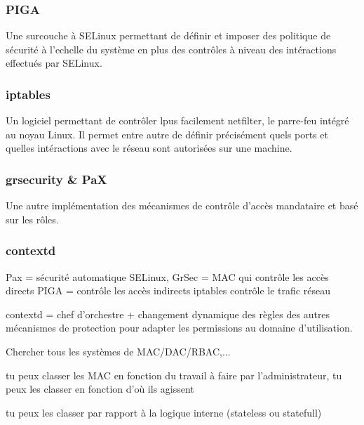 \subsubsection{PIGA}

Une surcouche à SELinux permettant de définir et imposer des politique de sécurité à l'echelle du système en plus des contrôles à niveau des intéractions effectués par SELinux.

\subsubsection{iptables}

Un logiciel permettant de contrôler lpus facilement netfilter, le parre-feu intégré au noyau Linux. Il permet entre autre de définir précisément quels ports et quelles intéractions avec le réseau sont autorisées sur une machine.

\subsubsection{grsecurity \& PaX}

Une autre implémentation des mécanismes de contrôle d'accès mandataire et basé sur les rôles.

\subsubsection{contextd}

Pax = sécurité automatique
SELinux, GrSec = MAC qui contrôle les accès directs
PIGA = contrôle les accès indirects
iptables contrôle le trafic réseau

contextd = chef d'orchestre + changement dynamique des règles des autres  mécanismes de protection pour adapter les permissions au domaine d'utilisation.

Chercher tous les systèmes de MAC/DAC/RBAC,...

tu peux classer les MAC en fonction du travail à faire par l'administrateur, tu peux les classer en fonction d'où ils agissent


tu peux les classer par rapport à la logique interne (stateless ou statefull)

